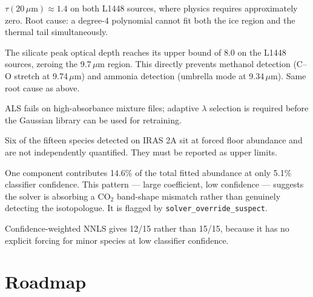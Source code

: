 \documentclass[11pt,a4paper]{article}
\newcommand{\um}{\,$\mu$m}
\newcommand{\code}[1]{\texttt{\small #1}}
\newcommand{\cotwo}{CO$_2$}
\begin{document}
\begin{description}[style=nextline, leftmargin=0pt, labelindent=0pt, labelwidth=0pt, labelsep=0pt, itemsep=5pt]
  \item[Long-wavelength optical depth artifact.]
  $\tau(20\,\mu\text{m})\approx1.4$ on both L1448 sources, where physics
  requires approximately zero. Root cause: a degree-4 polynomial cannot fit
  both the ice region and the thermal tail simultaneously.

  \item[Silicate over-subtraction.]
  The silicate peak optical depth reaches its upper bound of 8.0 on the
  L1448 sources, zeroing the 9.7\um{} region. This directly prevents
  methanol detection (C--O stretch at 9.74\um) and ammonia detection
  (umbrella mode at 9.34\um). Same root cause as above.

  \item[Gaussian baseline quality.]
  ALS fails on high-absorbance mixture files; adaptive $\lambda$ selection
  is required before the Gaussian library can be used for retraining.

  \item[Floor-level detections.]
  Six of the fifteen species detected on IRAS 2A sit at forced floor
  abundance and are not independently quantified. They must be reported as
  upper limits.

  \item[Suspicious \cotwo{} isotopologue component.]
  One component contributes 14.6\% of the total fitted abundance at only
  5.1\% classifier confidence. This pattern --- large coefficient, low
  confidence --- suggests the solver is absorbing a \cotwo{} band-shape
  mismatch rather than genuinely detecting the isotopologue. It is flagged
  by \code{solver\_override\_suspect}.

  \item[Option C underperformance.]
  Confidence-weighted NNLS gives 12/15 rather than 15/15, because it has no
  explicit forcing for minor species at low classifier confidence.
\end{description}

\section{Roadmap}
\end{document}
